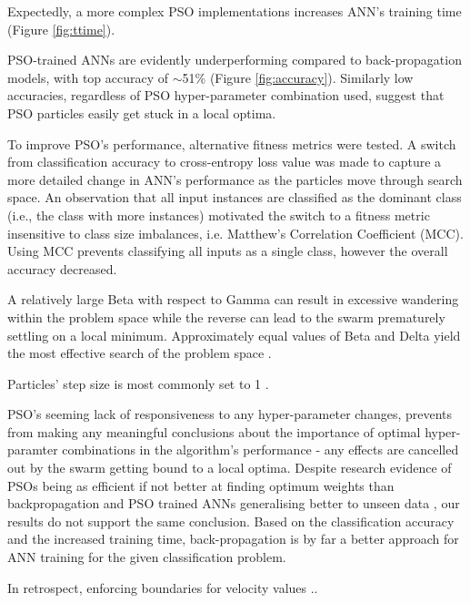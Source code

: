 \documentclass[12pt]{article}
\begin{document}
Expectedly, a more complex PSO implementations increases ANN's training time (Figure \ref{fig:ttime}). 

PSO-trained ANNs are evidently underperforming compared to back-propagation models, with top accuracy of $\sim$51\% (Figure \ref{fig:accuracy}). Similarly low accuracies, regardless of PSO hyper-parameter combination used, suggest that PSO particles easily get stuck in a local optima.

To improve PSO's performance, alternative fitness metrics were tested. A switch from classification accuracy to cross-entropy loss value was made to capture a more detailed change in ANN's performance as the particles move through search space.  An observation that all input instances are classified as the dominant class (i.e., the class with more instances) motivated the switch to a fitness metric insensitive to class size  imbalances, i.e. Matthew's Correlation Coefficient (MCC). Using MCC prevents classifying all inputs as a single class, however the overall accuracy decreased. 
 

A relatively large Beta with respect to Gamma can result in excessive wandering within the problem space while the reverse  can lead to the swarm prematurely settling on a local minimum. Approximately equal values of Beta and Delta yield the most effective search of the problem space \cite{Kennedy}.

Particles' step size is most commonly set to 1 \cite{Luke}. 


PSO's seeming lack of responsiveness to any hyper-parameter changes, prevents from making any meaningful conclusions about the importance of optimal hyper-paramter combinations in the algorithm's performance - any effects are cancelled out by the swarm getting bound to a local optima. Despite research evidence of PSOs being as efficient if not better at finding optimum weights than backpropagation and PSO trained ANNs generalising better to unseen data \cite{Kennedy}, our results do not support the same conclusion. Based on the classification accuracy and the increased training time, back-propagation is by far a better approach for ANN training for the given classification problem.

In retrospect, enforcing boundaries for velocity values ..
\end{document}
